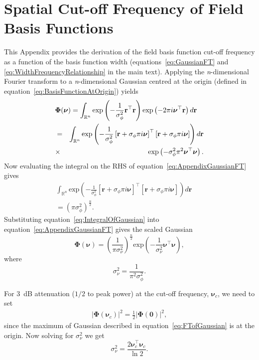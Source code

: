 \documentclass[]{article}
\begin{document}
\section*{Spatial Cut-off Frequency of Field Basis Functions}\label{ap:FrequencyAnalysis}
This Appendix provides the derivation of the field basis function cut-off frequency as a function of the basis function width (equations~\ref{eq:GaussianFT} and \ref{eq:WidthFrequencyRelationship} in the main text). Applying the \textit{n}-dimensional Fourier transform \cite{Arsac1966} to a \textit{n}-dimensional Gaussian centred at the origin (defined in equation~\ref{eq:BasisFunctionAtOrigin}) yields
\begin{eqnarray}\label{eq:AppendixGaussianFT}
 \lefteqn{\boldsymbol\Phi(\boldsymbol \nu)=\int_{\mathbb{R}^n}{\mathrm{exp}\left({-\frac{1}{\sigma_{\phi}^2}\mathbf r^\top\mathbf r}\right)\mathrm{exp}\left(-2\pi i\boldsymbol\nu^\top\mathbf r\right)d\mathbf r}} \nonumber \\
&=&\int_{\mathbb{R}^n}\mathrm{exp}\left(-\frac{1}{\sigma_{\phi}^2}\left[\mathbf r +\sigma_{\phi}\pi i \boldsymbol\nu\right]^\top\left[\mathbf r +\sigma_{\phi}\pi i \boldsymbol\nu\right]\right)d\mathbf r \nonumber \\
&\times& \mathrm{exp}\left(-\sigma_{\phi}^2\pi^2\boldsymbol\nu^\top \boldsymbol\nu\right).
\end{eqnarray}
Now evaluating the integral on the RHS of equation~\ref{eq:AppendixGaussianFT} gives 
\begin{eqnarray}\label{eq:IntegralOfGaussian}
\int_{\mathbb{R}^n}\mathrm{exp}\left(-\frac{1}{\sigma_{\phi}^2}\left[\mathbf r +\sigma_{\phi}\pi i \boldsymbol\nu\right]^\top\left[\mathbf r +\sigma_{\phi}\pi i \boldsymbol\nu\right]\right)d\mathbf r&& \nonumber \\
=\left(\pi\sigma_{\phi}^2\right)^{\frac{n}{2}}.&&
\end{eqnarray}
Substituting equation~\ref{eq:IntegralOfGaussian} into equation~\ref{eq:AppendixGaussianFT} gives the scaled Gaussian
\begin{equation}\label{eq:FTofGaussian}
\boldsymbol\Phi(\boldsymbol \nu)=\left(\frac{1}{\pi\sigma_{\nu}^2}\right)^{\frac{n}{2}}\mathrm{exp}\left(-\frac{1}{\sigma_{\nu}^2}\boldsymbol\nu^\top \boldsymbol\nu\right),
\end{equation} 
where 
\begin{equation}
	\sigma_{\nu}^2=\frac{1}{\pi^2\sigma_{\phi}^2}. 
\end{equation}

For $3$~dB attenuation ($1/2$ to peak power) at the cut-off frequency, $\boldsymbol\nu_c$, we need to set
\begin{eqnarray}
 \left|\boldsymbol\Phi(\boldsymbol\nu_{c})\right|^2=\frac{1}{2}\left|\boldsymbol\Phi(\mathbf 0)\right|^2,
\end{eqnarray}
since the maximum of Gaussian described in equation~\ref{eq:FTofGaussian} is at the origin. Now solving for $\sigma_{\nu}^2$ we get
\begin{equation}
 \sigma_{\nu}^2=\frac{2\boldsymbol\nu_{c}^\top \boldsymbol\nu_{c}}{\ln 2 }.
\end{equation}
\end{document}
